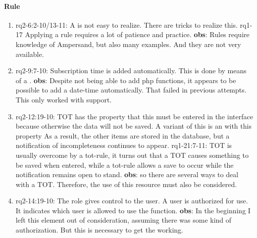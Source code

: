 \paragraph{Rule}
\begin{enumerate}
    \item rq2-6:2-10/13-11: A  is not easy to realize.
    There are tricks to realize this.
    \newline rq1-17 Applying a rule requires a lot of patience and practice.
    \newline\textbf{obs}: Rules require knowledge of Ampersand, but also many examples.
    And they are not very available.

    \item rq2-9:7-10: Subscription time is added automatically.
    This is done by means of a .
    \newline\textbf{obs}: Despite not being able to add {php} functions, it appears to be possible to add a date-time automatically.
    That failed in previous attempts.
    This only worked with support.

    \item rq2-12:19-10: TOT has the property that this must be entered in the {interface} because otherwise the data will not be saved.
    A variant of this is an  with this property
    As a result, the other items are stored in the database, but a notification of incompleteness continues to appear.
    \newline rq1-21:7-11: TOT is usually overcome by a tot-rule, it turns out that a TOT causes something to be saved when entered, while a tot-rule allows a save to occur while the notification remains open to stand.
    \newline\textbf{obs}: so there are several ways to deal with a TOT.
    Therefore, the use of this resource must also be considered.

    \item rq2-14:19-10: The role gives control to the user.
    A user is {authorized} for use.
    It indicates which user is allowed to use the function.
    \newline\textbf{obs}: In the beginning I left this element out of consideration, assuming there was some kind of authorization.
    But this is necessary to get the  working.

\end{enumerate}


\newpage
